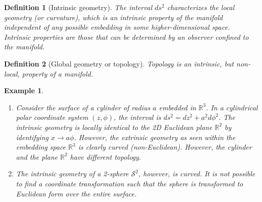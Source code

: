 \documentclass[a4paper]{article}
\newtheorem{eg}{Example}[section]
\theoremstyle{new}
\newtheorem{defi}{Definition}[section]
\begin{document}
\begin{defi}[Intrinsic geometry]
The interval $ds^2$ characterizes the local geometry (or curvature), which is an intrinsic property of the manifold independent of any possible embedding in some higher-dimensional space. Intrinsic properties are those that can be determined by an observer confined to the manifold.
\end{defi}
\begin{defi}[Global geometry or topology]
Topology is an intrinsic, but non-local, property of a manifold.
\end{defi}
\begin{eg}\leavevmode
\begin{enumerate}
\item Consider the surface of a cylinder of radius $a$ embedded in $\mathbb{R}^3$. In a cylindrical polar coordinate system $(z,\phi)$, the interval is $ds^2=dz^2+a^2d\phi^2$. The intrinsic geometry is locally identical to the 2D Euclidean plane $\mathbb{R}^2$ by identifying $x\rightarrow a\phi$. However, the extrinsic geometry as seen within the embedding space $\mathbb{R}^3$ is clearly curved (non-Euclidean). However, the cylinder and the plane $\mathbb{R}^2$ have different topology. 
\item The intrinsic geometry of a 2-sphere $\mathcal{S}^2$, however, is curved. It is not possible to find a coordinate transformation such that the sphere is transformed to Euclidean form over the entire surface.
\end{enumerate}
\end{eg}
\end{document}
